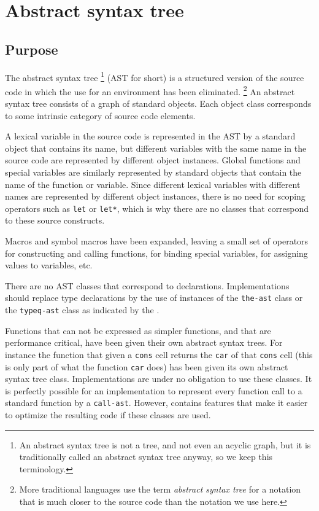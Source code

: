 \chapter{Abstract syntax tree}
\label{chap-abstract-syntax-tree}

\section{Purpose}

The abstract syntax tree%
\footnote{An abstract syntax tree is not a tree, and not even an
  acyclic graph, but it is traditionally called an abstract syntax
  tree anyway, so we keep this terminology.}  (AST for short) is a
structured version of the source code in which the use for an
environment has been eliminated.%
\footnote{More traditional languages use the term \emph{abstract
    syntax tree} for a notation that is much closer to the source code
  than the notation we use here.}
An abstract syntax tree consists of a graph of standard objects.  Each
object class corresponds to some intrinsic category of source code
elements.

A lexical variable in the source code is represented in the AST by a
standard object that contains its name, but different variables with
the same name in the source code are represented by different object
instances.  Global functions and special variables are similarly
represented by standard objects that contain the name of the function
or variable.  Since different lexical variables with different names
are represented by different object instances, there is no need for
scoping operators such as \texttt{let} or \texttt{let*}, which is why
there are no classes that correspond to these source constructs.

Macros and symbol macros have been expanded, leaving a small set of
operators for constructing and calling functions, for binding special
variables, for assigning values to variables, etc.

There are no AST classes that correspond to declarations.
Implementations should replace type declarations by the use of
instances of the \texttt{the-ast} class or the \texttt{typeq-ast}
class as indicated by the \hs{}.

Functions that can not be expressed as simpler functions, and that are
performance critical, have been given their own abstract syntax trees.
For instance the function that given a \texttt{cons} cell returns the
\texttt{car} of that \texttt{cons} cell (this is only part of what the
\commonlisp{} function \texttt{car} does) has been given its own abstract
syntax tree class.  Implementations are under no obligation to use
these classes.  It is perfectly possible for an implementation to
represent every function call to a standard \commonlisp{} function by a
\texttt{call-ast}.  However, \sysname{} contains features that make it
easier to optimize the resulting code if these classes are used.


